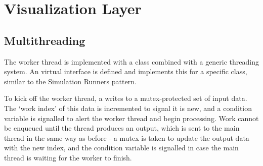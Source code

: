 \section{Visualization Layer}\label{sec:ImplementationViz}
\subsection{Multithreading}
The worker thread is implemented with a  class combined with a generic threading system.
An  virtual interface is defined and  implements this for a specific  class, similar to the Simulation Runners pattern.

To kick off the worker thread, a  writes to a mutex-protected set of input data.
The `work index' of this data is incremented to signal it is new, and a condition variable is signalled to alert the worker thread and begin processing.
Work cannot be enqueued until the thread produces an output, which is sent to the main thread in the same way as before - a mutex is taken to update the output data with the new index, and the condition variable is signalled in case the main thread is waiting for the worker to finish.

